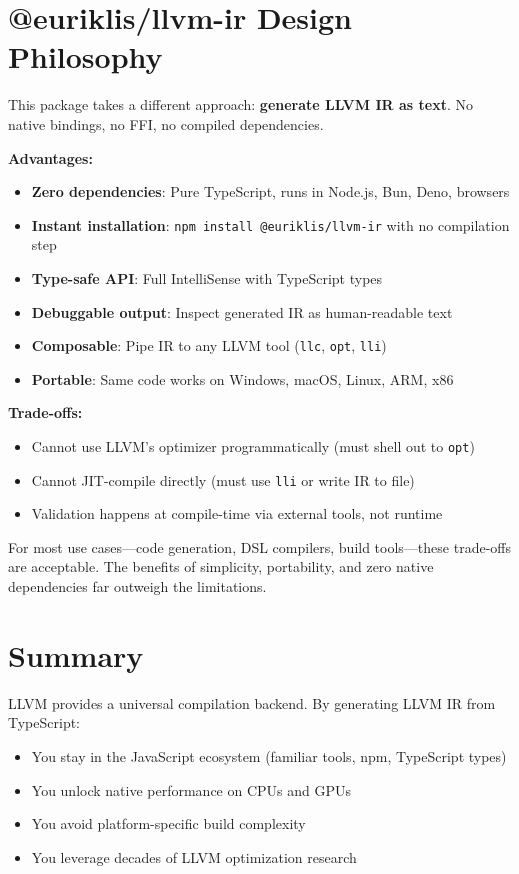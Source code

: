 \documentclass[11pt,oneside]{book}
\begin{document}
\section{@euriklis/llvm-ir Design Philosophy}

This package takes a different approach: \textbf{generate LLVM IR as text}. No native bindings, no FFI, no compiled dependencies.

\textbf{Advantages:}
\begin{itemize}[noitemsep]
  \item \textbf{Zero dependencies}: Pure TypeScript, runs in Node.js, Bun, Deno, browsers
  \item \textbf{Instant installation}: \texttt{npm install @euriklis/llvm-ir} with no compilation step
  \item \textbf{Type-safe API}: Full IntelliSense with TypeScript types
  \item \textbf{Debuggable output}: Inspect generated IR as human-readable text
  \item \textbf{Composable}: Pipe IR to any LLVM tool (\texttt{llc}, \texttt{opt}, \texttt{lli})
  \item \textbf{Portable}: Same code works on Windows, macOS, Linux, ARM, x86
\end{itemize}

\textbf{Trade-offs:}
\begin{itemize}[noitemsep]
  \item Cannot use LLVM's optimizer programmatically (must shell out to \texttt{opt})
  \item Cannot JIT-compile directly (must use \texttt{lli} or write IR to file)
  \item Validation happens at compile-time via external tools, not runtime
\end{itemize}

For most use cases—code generation, DSL compilers, build tools—these trade-offs are acceptable. The benefits of simplicity, portability, and zero native dependencies far outweigh the limitations.

\section{Summary}

LLVM provides a universal compilation backend. By generating LLVM IR from TypeScript:
\begin{itemize}[noitemsep]
  \item You stay in the JavaScript ecosystem (familiar tools, npm, TypeScript types)
  \item You unlock native performance on CPUs and GPUs
  \item You avoid platform-specific build complexity
  \item You leverage decades of LLVM optimization research
\end{itemize}
\end{document}
